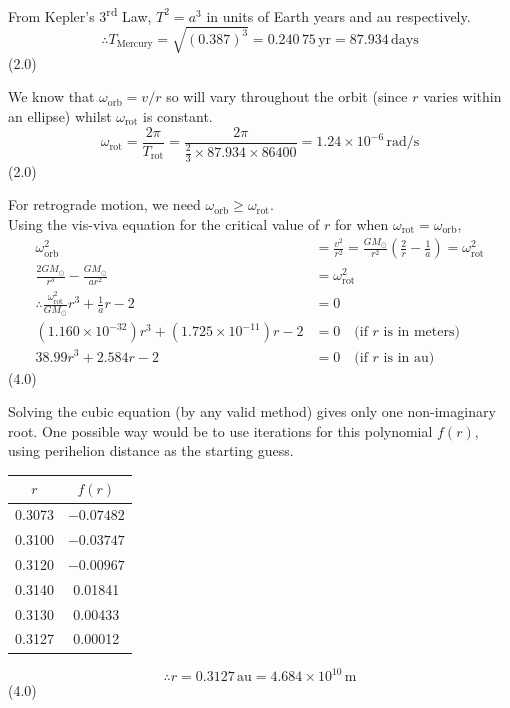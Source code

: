 From Kepler's 3\textsuperscript{rd} Law, $T^2 = a^3$ in units of Earth years and au respectively.
\[
\therefore T_{\mathrm{Mercury}} = \sqrt{(0.387)^3} = 0.240\,75\,\mathrm{yr} = 87.934\,\mathrm{days}
\]
\hfill(2.0)

We know that $\omega_{\mathrm{orb}} = v/r$ so will vary throughout the orbit (since $r$ varies within
an ellipse) whilst $\omega_{\mathrm{rot}}$ is constant.
\[
\omega_{\mathrm{rot}} = \frac{2\pi}{T_{\mathrm{rot}}}
= \frac{2\pi}{\frac{2}{3} \times 87.934 \times 86400}
= 1.24 \times 10^{-6}\,\mathrm{rad/s}
\]
\hfill(2.0)

For retrograde motion, we need $\omega_{\mathrm{orb}} \ge \omega_{\mathrm{rot}}$.\\
Using the vis-viva equation for the critical value of $r$ for when
$\omega_{\mathrm{rot}} = \omega_{\mathrm{orb}}$,
\begin{align*}
\omega_{\mathrm{orb}}^2 &= \frac{v^2}{r^2}
  = \frac{GM_\odot}{r^2}\left(\frac{2}{r} - \frac{1}{a}\right) = \omega_{\mathrm{rot}}^2\\
\frac{2GM_\odot}{r^3} - \frac{GM_\odot}{ar^2} &= \omega_{\mathrm{rot}}^2\\
\therefore \frac{\omega_{\mathrm{rot}}^2}{GM_\odot}r^3 + \frac{1}{a}r - 2 &= 0\\
(1.160\times10^{-32})r^3 + (1.725\times10^{-11})r - 2 &= 0 \quad
  \text{(if $r$ is in meters)}\\
38.99r^3 + 2.584r - 2 &= 0 \quad \text{(if $r$ is in au)}
\end{align*}
\hfill(4.0)

Solving the cubic equation (by any valid method) gives only one non-imaginary root.
One possible way would be to use iterations for this polynomial $f(r)$, using perihelion
distance as the starting guess.
\begin{center}
\begin{tabular}{c|c}
$r$ & $f(r)$\\
\hline
0.3073 & $-0.07482$\\
0.3100 & $-0.03747$\\
0.3120 & $-0.00967$\\
0.3140 & 0.01841\\
0.3130 & 0.00433\\
0.3127 & 0.00012\\
\end{tabular}
\end{center}
\[
\therefore r = 0.3127\,\mathrm{au} = 4.684\times10^{10}\,\mathrm{m}
\]
\hfill(4.0)


